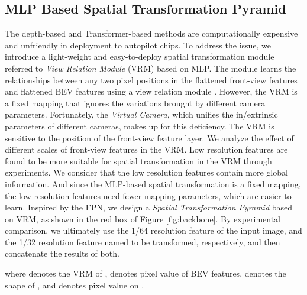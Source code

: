 \documentclass[10pt,twocolumn,letterpaper]{article}
\begin{document}
\subsection{MLP Based Spatial Transformation Pyramid}
The depth-based \cite{philion2020lift,huang2021bevdet} and Transformer-based methods\cite{chen2022persformer,li2022bevformer} are computationally expensive and unfriendly in deployment to autopilot chips. To address the issue, we introduce a light-weight and easy-to-deploy spatial transformation module referred to \textit{View Relation Module} (VRM) \cite{pan2020cross} based on MLP. The module learns the relationships between any two pixel positions in the flattened front-view features and flattened BEV features using a view relation module . However, the VRM is a fixed mapping that ignores the variations brought by different camera parameters. Fortunately, the \textit{Virtual Camera}, which unifies the in/extrinsic parameters of different cameras, makes up for this deficiency. The VRM is sensitive to the position of the front-view feature layer. We analyze the effect of different scales of front-view features in the VRM. Low resolution features are found to be more suitable for spatial transformation in the VRM through experiments. We consider that the low resolution features contain more global information. And since the MLP-based spatial transformation is a fixed mapping, the low-resolution features need fewer mapping parameters, which are easier to learn. Inspired by the FPN\cite{lin2017feature}, we design a \textit{Spatial Transformation Pyramid} based on VRM, as shown in the red box of Figure \ref{fig:backbone}. By experimental comparison, we ultimately use the 1/64 resolution feature of the input image,  and the 1/32 resolution feature named  to be transformed, respectively, and then concatenate the results of both.

where  denotes the VRM of ,  denotes pixel value of BEV features,  denotes the shape of , and  denotes pixel value on .
\end{document}
